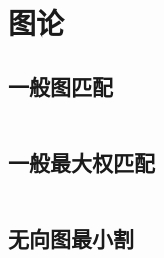 \chapter{图论}
\section{一般图匹配}
\inputminted{cpp}{\source/graph-theory/general-matching.cpp}
\section{一般最大权匹配}
\inputminted{cpp}{\source/graph-theory/weighted_blossom.cpp}
\section{无向图最小割}
\inputminted{cpp}{\source/graph-theory/StoerWagner_O(V^3).cpp}